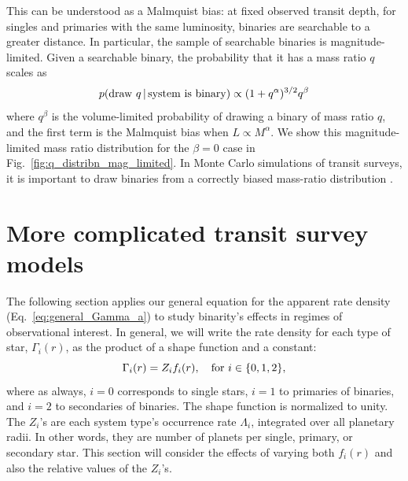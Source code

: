 \documentclass[12pt,modern]{aastex61}
\begin{document}
This can be understood as a Malmquist bias: at fixed observed transit 
depth, for singles and primaries with the same luminosity, binaries are 
searchable to a greater distance.
In particular, the sample of searchable binaries is magnitude-limited.
Given a searchable binary, the probability that it has a mass ratio $q$ 
scales as
\begin{equation}
p({\rm draw\ }q\,|\,{\rm system\ is\ binary}) \propto 
(1+q^\alpha)^{3/2} q^\beta 
\label{eq:Malmquist_bias}
\end{equation}
where $q^\beta$ is the volume-limited probability of drawing a binary of mass 
ratio $q$, and the first term is the Malmquist bias when $L\propto M^\alpha$.
We show this magnitude-limited mass ratio distribution for the $\beta=0$ case 
in Fig.~\ref{fig:q_distribn_mag_limited}.
In Monte Carlo simulations of transit surveys, it is 
important to draw binaries from a correctly biased mass-ratio distribution 
\citep[\textit{e.g.},][]{bakos_hatsouth:_2013,sullivan_transiting_2015,
    gunther_new_2017}.



%

\section{More complicated transit survey models}
\label{sec:more_complicated}
The following section applies our general equation for the apparent rate 
density (Eq.~\ref{eq:general_Gamma_a}) to study binarity's effects in regimes 
of observational interest.
In general, we will write the rate density for each type of star, 
$\Gamma_i(r)$, as the product of a shape function and a constant:
\begin{equation}
\Gamma_i(r) = Z_i f_i(r), \quad {\rm for\ }i\in\{0,1,2\},
\end{equation}
where as always, $i=0$ corresponds to single stars, $i=1$ to primaries of 
binaries, and $i=2$ to secondaries of binaries.
The shape function is normalized to unity.
The $Z_i$'s are each system type's occurrence rate $\Lambda_i$, integrated 
over all planetary radii. In other words, they are number of planets per 
single, primary, or secondary star.
This section will consider the effects of varying both $f_i(r)$ and also the
relative values of the $Z_i$'s.

\end{document}
